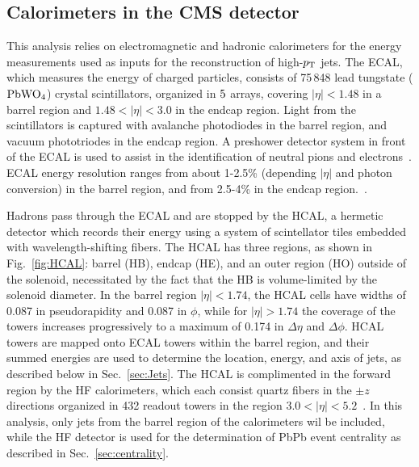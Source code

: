 \subsection{Calorimeters in the CMS detector}
\label{sec:calorimeters}

This analysis relies on electromagnetic and hadronic calorimeters for the energy measurements used as inputs for the reconstruction of high-$p_{\rm T}$ jets.  The ECAL, which measures the energy of charged particles, consists of 75\,848 lead tungstate ($\rm PbWO_{4}$) crystal scintillators, organized in $5 \time 5$ arrays, covering $|\eta| < 1.48 $ in a barrel region and $1.48 < |\eta| < 3.0$ in the endcap region.  Light from the scintillators is captured with avalanche photodiodes in the barrel region, and vacuum phototriodes in the endcap region.  A preshower detector system in front of the ECAL is used to assist in the identification of neutral pions and electrons~\cite{Chatrchyan:2008zzk}.  ECAL energy resolution ranges from about 1-2.5\% (depending $|\eta|$ and photon conversion) in the barrel region, and from 2.5-4\% in the endcap region.~\cite{CMS:EGM-14-001}. 

Hadrons pass through the ECAL and are stopped by the HCAL, a hermetic detector which records their energy using a system of scintellator tiles embedded with wavelength-shifting  fibers.  The HCAL has three regions, as shown in Fig.~\ref{fig:HCAL}:  barrel (HB), endcap (HE), and an outer region (HO) outside of the solenoid, necessitated by the fact that the HB is volume-limited by the solenoid diameter.  In the barrel region $|\eta| < 1.74$, the HCAL cells have widths of 0.087 in pseudorapidity and 0.087 in $\phi$, while for $|\eta| > 1.74$ the coverage of the towers increases progressively to a maximum of 0.174 in $\Delta \eta$ and $\Delta \phi$.  HCAL towers are mapped onto ECAL towers within the barrel region, and their summed energies are used to determine the location, energy, and axis of jets, as described below in Sec.~\ref{sec:Jets}.  The HCAL is complimented in the forward region by the HF calorimeters, which each consist quartz fibers in the $\pm z$ directions organized in 432 readout towers in the region $3.0 < |\eta| < 5.2$~\cite{Chatrchyan:2008zzk}.  In this analysis, only jets from the barrel region of the calorimeters wil be included, while the HF detector is used for the determination of PbPb event centrality as described in Sec.~\ref{sec:centrality}. 

